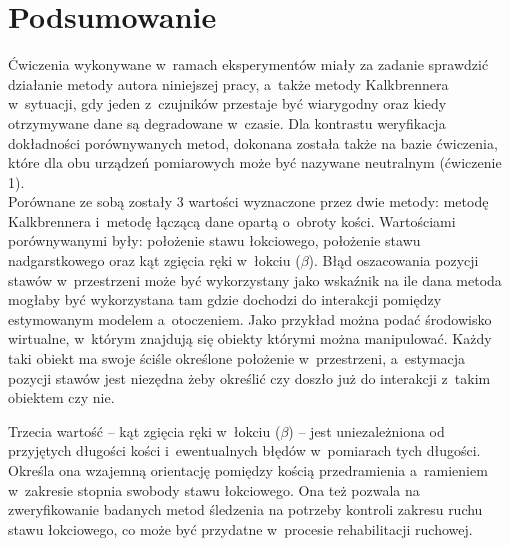 \section{Podsumowanie}
																								
Ćwiczenia wykonywane w~ramach eksperymentów miały za zadanie sprawdzić działanie metody autora niniejszej pracy, a~także metody Kalkbrennera w~sytuacji, gdy jeden z~czujników przestaje być wiarygodny oraz kiedy otrzymywane dane są degradowane w~czasie. Dla kontrastu weryfikacja dokładności porównywanych metod, dokonana została także na bazie ćwiczenia, które dla obu urządzeń pomiarowych może być nazywane neutralnym (ćwiczenie 1).\\
																								
Porównane ze sobą zostały 3 wartości wyznaczone przez dwie metody: metodę Kalkbrennera i~metodę łączącą dane opartą o~obroty kości. Wartościami porównywanymi były: położenie stawu łokciowego, położenie stawu nadgarstkowego oraz kąt zgięcia ręki w~łokciu ($\beta$). Błąd oszacowania pozycji stawów w~przestrzeni może być wykorzystany jako wskaźnik na ile dana metoda mogłaby być wykorzystana tam gdzie dochodzi do interakcji pomiędzy estymowanym modelem a~otoczeniem. Jako przykład można podać środowisko wirtualne, w~którym znajdują się obiekty którymi można manipulować. Każdy taki obiekt ma swoje ściśle określone położenie w~przestrzeni, a~estymacja pozycji stawów jest niezędna żeby określić czy doszło już do interakcji z~takim obiektem czy nie.
																								 
Trzecia wartość -- kąt zgięcia ręki w~łokciu ($\beta$) -- jest uniezależniona od przyjętych długości kości i~ewentualnych błędów w~pomiarach tych długości. Określa ona wzajemną orientację pomiędzy kością przedramienia a~ramieniem w~zakresie stopnia swobody stawu łokciowego. Ona też pozwala na zweryfikowanie badanych metod śledzenia na potrzeby kontroli zakresu ruchu stawu łokciowego, co może być przydatne w~procesie rehabilitacji ruchowej. \\ 
																								
